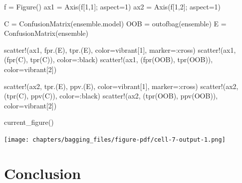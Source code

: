 \documentclass[
  letterpaper,
]{scrbook}
\newenvironment{Shaded}{\begin{snugshade}}{\end{snugshade}}
\newcommand{\FloatTok}[1]{\textcolor[rgb]{0.68,0.00,0.00}{#1}}
\newcommand{\FunctionTok}[1]{\textcolor[rgb]{0.28,0.35,0.67}{#1}}
\newcommand{\NormalTok}[1]{\textcolor[rgb]{0.00,0.23,0.31}{#1}}
\newcommand{\OperatorTok}[1]{\textcolor[rgb]{0.37,0.37,0.37}{#1}}
\begin{document}
\begin{Shaded}
\begin{Highlighting}[]
\NormalTok{f }\OperatorTok{=} \FunctionTok{Figure}\NormalTok{()}
\NormalTok{ax1 }\OperatorTok{=} \FunctionTok{Axis}\NormalTok{(f[}\FloatTok{1}\NormalTok{,}\FloatTok{1}\NormalTok{]; aspect}\OperatorTok{=}\FloatTok{1}\NormalTok{)}
\NormalTok{ax2 }\OperatorTok{=} \FunctionTok{Axis}\NormalTok{(f[}\FloatTok{1}\NormalTok{,}\FloatTok{2}\NormalTok{]; aspect}\OperatorTok{=}\FloatTok{1}\NormalTok{)}

\NormalTok{C }\OperatorTok{=} \FunctionTok{ConfusionMatrix}\NormalTok{(ensemble.model)}
\NormalTok{OOB }\OperatorTok{=} \FunctionTok{outofbag}\NormalTok{(ensemble)}
\NormalTok{E }\OperatorTok{=} \FunctionTok{ConfusionMatrix}\NormalTok{(ensemble)}

\FunctionTok{scatter!}\NormalTok{(ax1, }\FunctionTok{fpr}\NormalTok{.(E), }\FunctionTok{tpr}\NormalTok{.(E), color}\OperatorTok{=}\NormalTok{vibrant[}\FloatTok{1}\NormalTok{], marker}\OperatorTok{=:}\NormalTok{cross)}
\FunctionTok{scatter!}\NormalTok{(ax1, (}\FunctionTok{fpr}\NormalTok{(C), }\FunctionTok{tpr}\NormalTok{(C)), color}\OperatorTok{=:}\NormalTok{black)}
\FunctionTok{scatter!}\NormalTok{(ax1, (}\FunctionTok{fpr}\NormalTok{(OOB), }\FunctionTok{tpr}\NormalTok{(OOB)), color}\OperatorTok{=}\NormalTok{vibrant[}\FloatTok{2}\NormalTok{])}

\FunctionTok{scatter!}\NormalTok{(ax2, }\FunctionTok{tpr}\NormalTok{.(E), }\FunctionTok{ppv}\NormalTok{.(E), color}\OperatorTok{=}\NormalTok{vibrant[}\FloatTok{1}\NormalTok{], marker}\OperatorTok{=:}\NormalTok{cross)}
\FunctionTok{scatter!}\NormalTok{(ax2, (}\FunctionTok{tpr}\NormalTok{(C), }\FunctionTok{ppv}\NormalTok{(C)), color}\OperatorTok{=:}\NormalTok{black)}
\FunctionTok{scatter!}\NormalTok{(ax2, (}\FunctionTok{tpr}\NormalTok{(OOB), }\FunctionTok{ppv}\NormalTok{(OOB)), color}\OperatorTok{=}\NormalTok{vibrant[}\FloatTok{2}\NormalTok{])}

\FunctionTok{current\_figure}\NormalTok{()}
\end{Highlighting}
\end{Shaded}

\texttt{[image: chapters/bagging\_files/figure-pdf/cell-7-output-1.png]}

\section{Conclusion}\label{conclusion-6}

\end{document}
